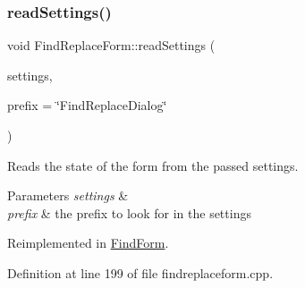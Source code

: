 \subsubsection{\texorpdfstring{read\+Settings()}{readSettings()}}
{\footnotesize\ttfamily void Find\+Replace\+Form\+::read\+Settings (\begin{DoxyParamCaption}\item[{Q\+Settings \&}]{settings,  }\item[{const Q\+String \&}]{prefix = {\ttfamily \char`\"{}FindReplaceDialog\char`\"{}} }\end{DoxyParamCaption})\hspace{0.3cm}{\ttfamily [virtual]}}

Reads the state of the form from the passed settings. 
\begin{DoxyParams}{Parameters}
{\em settings} & \\
\hline
{\em prefix} & the prefix to look for in the settings \\
\hline
\end{DoxyParams}


Reimplemented in \hyperlink{class_find_form_abfa26fe2e262103bbd9d694e748c0884}{Find\+Form}.



Definition at line 199 of file findreplaceform.\+cpp.


